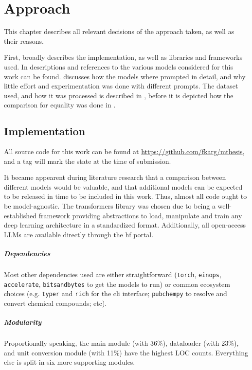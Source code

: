 \chapter{Approach}\label{chap:approach}
This chapter describes all relevant decisions of the approach taken, as well as their reasons.

First,  broadly describes the implementation, as well as libraries and frameworks used.
In  descriptions and references to the various models considered for this work can be found.
 discusses how the models where prompted in detail, and why little effort and experimentation was done with different prompts.
The dataset used, and how it was processed is described in , before it is depicted how the comparison for equality was done in .


\section{Implementation}\label{sec:impl}
All source code for this work can be found at \url{https://github.com/fkarg/mthesis}, and a tag will mark the state at the time of submission.

It became appearent during literature research that a comparison between different models would be valuable, and that additional models can be expected to be released in time to be included in this work.
Thus, almost all code ought to be model-agnostic.
The \acrlong{transformers} library was chosen due to being a well-established framework providing abstractions to load, manipulate and train any deep learning architecture in a standardized format.
Additionally, all open-access \glspl{LLM} are available directly through the \gls{hf} portal.

\paragraph{Dependencies}
Most other dependencies used are either straightforward (\texttt{torch}, \texttt{einops}, \texttt{accelerate}, \texttt{bitsandbytes} to get the models to run) or common ecosystem choices (e.g. \texttt{typer} and \texttt{rich} for the cli interface; \texttt{pubchempy} to resolve and convert chemical compounds; etc).

\paragraph{Modularity}
Proportionally speaking, the main module (with 36\%), dataloader (with 23\%), and unit conversion module (with 11\%) have the highest \gls{LOC} counts. Everything else is split in six more supporting modules.


